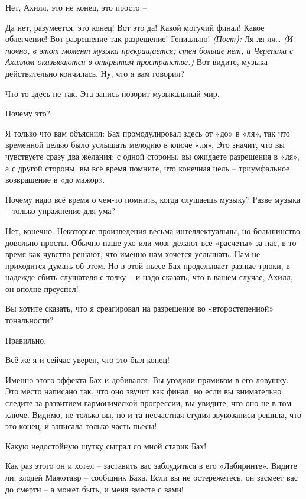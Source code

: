 \documentclass[../main.tex]{subfiles}
\begin{document}
\begin{Dialogue}
\begin{sublevel}
\begin{sublevel}
\begin{sublevel}
 Нет, Ахилл, это не конец, это просто \---

 Да нет, разумеется, это конец! Вот это да! Какой могучий финал! Какое облегчение! Вот разрешение так разрешение! Гениально! \emph{(Поет):} Ля-ля-ля\ldots{} \emph{(И точно, в этот момент музыка прекращается; стен больше нет, и Черепаха с Ахиллом оказываются в открытом пространстве.)} Вот видите, музыка действительно кончилась. Ну, что я вам говорил?

 Что-то здесь не так. Эта запись позорит музыкальный мир.

 Почему это?

 Я только что вам объяснил: Бах промодулировал здесь от «до» в «ля», так что временной целью было услышать мелодию в ключе «ля». Это значит, что вы чувствуете сразу два желания: с одной стороны, вы ожидаете разрешения в «ля», а с другой стороны, вы всё время помните, что конечная цель \--- триумфальное возвращение в «до мажор».

 Почему надо всё время о чем-то помнить, когда слушаешь музыку? Разве музыка \--- только упражнение для ума?

 Нет, конечно. Некоторые произведения весьма интеллектуальны, но большинство довольно просты. Обычно наше ухо или мозг делают все «расчеты» за нас, в то время как чувства решают, что именно нам хочется услышать. Нам не приходится думать об этом. Но в этой пьесе Бах проделывает разные трюки, в надежде сбить слушателя с толку \--- и надо сказать, что в вашем случае, Ахилл, он вполне преуспел!

 Вы хотите сказать, что я среагировал на разрешение во «второстепенной» тональности?

 Правильно.

 Всё же я и сейчас уверен, что это был конец!

 Именно этого эффекта Бах и добивался. Вы угодили прямиком в его ловушку. Это место написано так, что оно звучит как финал; но если вы внимательно следите за развитием гармонической прогрессии, вы увидите, что оно не в том ключе. Видимо, не только вы, но и та несчастная студия звукозаписи решила, что это конец, и записала только часть пьесы!

 Какую недостойную шутку сыграл со мной старик Бах!

 Как раз этого он и хотел \--- заставить вас заблудиться в его «Лабиринте». Видите ли, злодей Мажотавр \--- сообщник Баха. Если вы не остережетесь, он засмеет вас до смерти \--- а может быть, и меня вместе с вами!


\end{sublevel}
\end{sublevel}
\end{sublevel}
\end{Dialogue}
\end{document}
